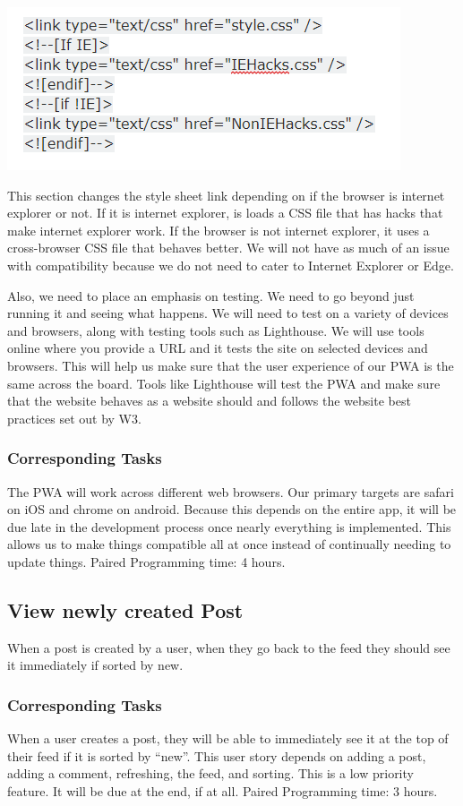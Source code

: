 \documentclass[12pt]{article}
\begin{document}
\includegraphics[scale=0.5]{img/ConditionalStyleSheet.png}\linebreak

This section changes the style sheet link depending on if the browser is internet explorer or not.  If it is internet explorer, is loads a CSS file that has hacks that make internet explorer work.  If the browser is not internet explorer, it uses a cross-browser CSS file that behaves better.  We will not have as much of an issue with compatibility because we do not need to cater to Internet Explorer or Edge.

Also, we need to place an emphasis on testing.  We need to go beyond just running it and seeing what happens.  We will need to test on a variety of devices and browsers, along with testing tools such as Lighthouse.  We will use tools online where you provide a URL and it tests the site on selected devices and browsers.  This will help us make sure that the user experience of our PWA is the same across the board.  Tools like Lighthouse will test the PWA and make sure that the website behaves as a website should and follows the website best practices set out by W3.

\subsubsection{Corresponding Tasks}
The PWA will work across different web browsers.  Our primary targets are safari on iOS and chrome on android.  Because this depends on the entire app, it will be due late in the development process once nearly everything is implemented.  This allows us to make things compatible all at once instead of continually needing to update things.  Paired Programming time: 4 hours.
\subsection{View newly created Post}
When a post is created by a user, when they go back to the feed they should see
it immediately if sorted by new.
\subsubsection{Corresponding Tasks}
	When a user creates a post, they will be able to immediately see it at the top of their feed if it is sorted by “new”.  This user story depends on adding a post, adding a comment, refreshing, the feed, and sorting.  This is a low priority feature.  It will be due at the end, if at all.  Paired Programming time: 3 hours.
\end{document}
